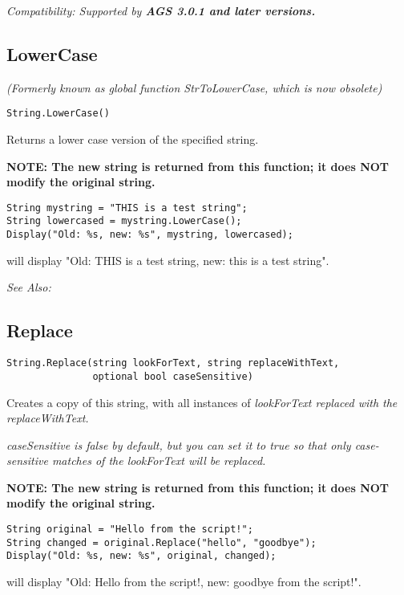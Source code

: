 \it{Compatibility:} Supported by \bf{AGS 3.0.1} and later versions.


\subsection{LowerCase}\label{String.LowerCase}%

\it{(Formerly known as global function StrToLowerCase, which is now obsolete)}

\begin{verbatim}
String.LowerCase()
\end{verbatim}
Returns a lower case version of the specified string.

\bf{NOTE:} The new string is returned from this function; it
does \bf{NOT} modify the original string.

\begin{verbatim}
String mystring = "THIS is a test string";
String lowercased = mystring.LowerCase();
Display("Old: %s, new: %s", mystring, lowercased);
\end{verbatim}
will display "Old: THIS is a test string, new: this is a test string".

\it{See Also:} 


\subsection{Replace}\label{String.Replace}%

\begin{verbatim}
String.Replace(string lookForText, string replaceWithText,
               optional bool caseSensitive)
\end{verbatim}
Creates a copy of this string, with all instances of \it{lookForText} replaced
with the \it{replaceWithText}.

\it{caseSensitive} is \it{false} by default, but you can set it to true so that only
case-sensitive matches of the \it{lookForText} will be replaced.

\bf{NOTE:} The new string is returned from this function; it
does \bf{NOT} modify the original string.

\begin{verbatim}
String original = "Hello from the script!";
String changed = original.Replace("hello", "goodbye");
Display("Old: %s, new: %s", original, changed);
\end{verbatim}
will display "Old: Hello from the script!, new: goodbye from the script!".

